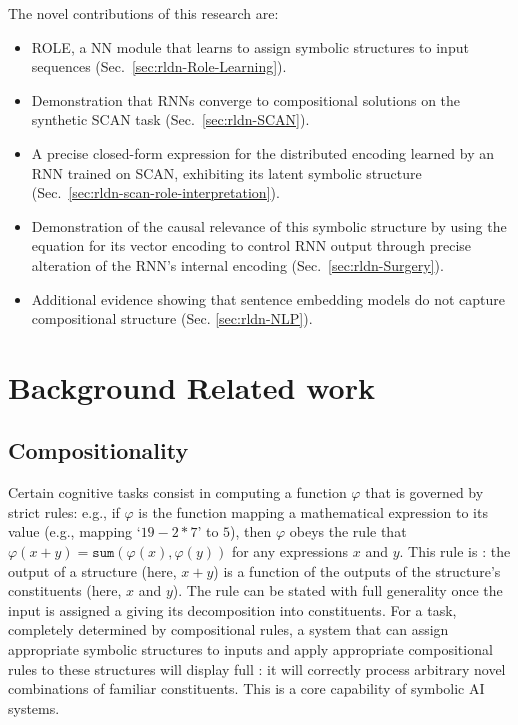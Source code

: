 The novel contributions of this research are:
\begin{itemize}
  \vspace{-2mm}
  \item ROLE, a NN module that learns to assign symbolic structures to input sequences (Sec.~\ref{sec:rldn-Role-Learning}).
  \vspace{-2mm}
  \item Demonstration that RNNs converge to compositional solutions on the synthetic SCAN task (Sec.~\ref{sec:rldn-SCAN}).
  \vspace{-2mm}
  \item A precise closed-form expression for the distributed encoding learned by an RNN trained on SCAN, exhibiting its latent symbolic structure (Sec.~\ref{sec:rldn-scan-role-interpretation}).
  \vspace{-2mm}
  \item Demonstration of the causal relevance of this symbolic structure by using the equation for its vector encoding to control RNN output through precise alteration of the RNN's internal encoding (Sec.~\ref{sec:rldn-Surgery}).
  \vspace{-2mm}
  \item Additional evidence showing that sentence embedding models do not capture compositional structure (Sec. \ref{sec:rldn-NLP}).
\end{itemize}

\section{Background Related work} \label{sec:rldn-Related}

\subsection{Compositionality}

Certain cognitive tasks consist in computing a function $\varphi$ that is governed by strict rules: e.g., if $\varphi$ is the function mapping a mathematical expression to its value (e.g., mapping `$19 - 2 * 7$' to $5$), then $\varphi$ obeys the rule that $\varphi(x + y) = \mathtt{sum}(\varphi(x), \varphi(y))$ for any expressions $x$ and $y$.
This rule is : the output of a structure (here, $x + y$) is a function of the outputs of the structure's constituents (here, $x$ and $y$). The rule can be stated with full generality once the input is assigned a  giving its decomposition into constituents. 
For a  task, completely determined by compositional rules, a system that can assign appropriate symbolic structures to inputs and apply appropriate compositional rules to these structures will display full : it will correctly process arbitrary novel combinations of familiar constituents. This is a core capability of symbolic AI systems.

